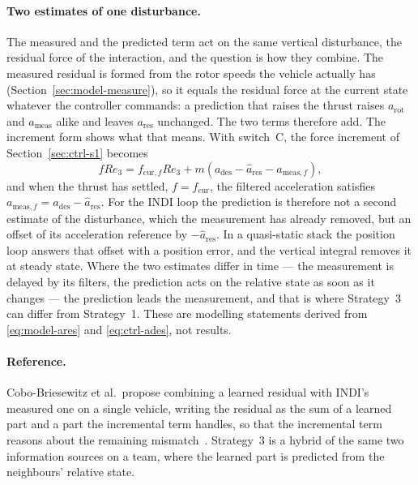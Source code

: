 \paragraph{Two estimates of one disturbance.} The measured and the predicted term act on the same
vertical disturbance, the residual force of the interaction, and the question is how they combine.
The measured residual is formed from the rotor speeds the vehicle actually has
(Section~\ref{sec:model-measure}), so it equals the residual force at the current state whatever
the controller commands: a prediction that raises the thrust raises $a_{\mathrm{rot}}$ and
$a_{\mathrm{meas}}$ alike and leaves $a_{\mathrm{res}}$ unchanged. The two terms therefore add.
The increment form shows what that means. With switch~C, the force increment of
Section~\ref{sec:ctrl-s1} becomes
\begin{equation}
  f R e_3 = f_{\mathrm{cur},f} R e_3 + m\left(a_{\mathrm{des}} - \hat a_{\mathrm{res}} - a_{\mathrm{meas},f}\right),
  \label{eq:ctrl-s3-increment}
\end{equation}
and when the thrust has settled, $f = f_{\mathrm{cur}}$, the filtered acceleration satisfies
$a_{\mathrm{meas},f} = a_{\mathrm{des}} - \hat a_{\mathrm{res}}$. For the INDI loop the prediction is
therefore not a second estimate of the disturbance, which the measurement has already removed, but
an offset of its acceleration reference by $-\hat a_{\mathrm{res}}$. In a quasi-static stack the
position loop answers that offset with a position error, and the vertical integral removes it at
steady state. Where the two estimates differ in time --- the measurement is delayed by its filters,
the prediction acts on the relative state as soon as it changes --- the prediction leads the
measurement, and that is where Strategy~3 can differ from Strategy~1. These are modelling
statements derived from \eqref{eq:model-ares} and \eqref{eq:ctrl-ades}, not results.

\paragraph{Reference.} Cobo-Briesewitz et al.\ propose combining a learned residual with INDI's
measured one on a single vehicle, writing the residual as the sum of a learned part and a part the
incremental term handles, so that the incremental term reasons about the remaining
mismatch~\cite{cobobriesewitz2026lindi}. Strategy~3 is a hybrid of the same two information
sources on a team, where the learned part is predicted from the neighbours' relative state.

